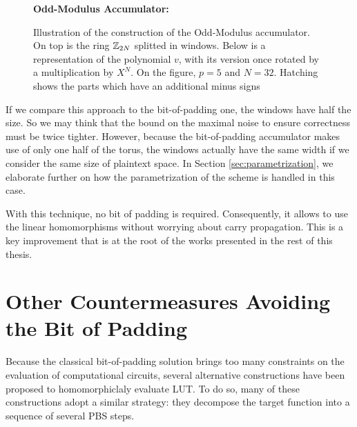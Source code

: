 \begin{figure}[H]
	\centering
	
	\vspace{1.5em}
%	
	\textbf{Odd-Modulus Accumulator:}\\[0.5em]
%	
	\caption{Illustration of the construction of the Odd-Modulus accumulator. On top is the ring $\mathbb{Z}_{2N}$ splitted in windows. Below is a representation of the polynomial $v$, with its version once rotated by a multiplication by $X^N$. On the figure, $p = 5$ and $N = 32$. Hatching shows the parts which have an additional minus signs}
	\label{fig:accumulator_odd}
\end{figure}


If we compare this approach to the bit-of-padding one, the windows have half the size. So we may think that the bound on the maximal noise to ensure correctness must be twice tighter. However, because the bit-of-padding accumulator makes use of only one half of the torus, the windows actually have the same width if we consider the same size of plaintext space. In Section \ref{sec:parametrization}, we elaborate further on how the parametrization of the scheme is handled in this case.


With this technique, no bit of padding is required. Consequently, it allows to use the linear homomorphisms without worrying about carry propagation. This is a key improvement that is at the root of the works presented in the rest of this thesis.




\section{Other Countermeasures Avoiding the Bit of Padding}
\label{sec:soa_padding_bit}

Because the classical bit-of-padding solution brings too many constraints on the evaluation of computational circuits, several alternative constructions have been proposed to homomorphiclaly evaluate LUT. To do so, many of these constructions adopt a similar strategy: they decompose the target function into a sequence of several PBS steps. 

